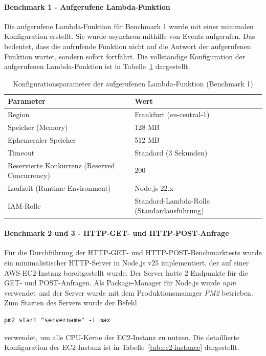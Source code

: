 \paragraph{Benchmark 1 - Aufgerufene Lambda-Funktion}
Die aufgerufene Lambda-Funktion für Benchmark 1 wurde mit einer minimalen Konfiguration erstellt. Sie wurde asynchron mithilfe von Events 
aufgerufen. Das bedeutet, dass die aufrufende Funktion nicht auf die Antwort der 
aufgerufenen Funktion wartet, sondern sofort fortfährt. Die vollständige Konfiguration der aufgerufenen Lambda-Funktion ist in Tabelle~\ref{tab:aufgerufene-lambda-config} dargestellt.
\begin{table}[H]
\centering
\caption{Konfigurationsparameter der aufgerufenen Lambda-Funktion (Benchmark 1)}
\label{tab:aufgerufene-lambda-config}
\begin{tabular}{|p{4cm}|p{4.5cm}|}
\hline
\textbf{Parameter} & \textbf{Wert} \\
\hline
Region & Frankfurt (eu-central-1) \\
\hline
Speicher (Memory) & 128 MB \\
\hline
Ephemeraler Speicher & 512 MB \\
\hline
Timeout & Standard (3 Sekunden) \\
\hline
Reservierte Konkurrenz (Reserved Concurrency) & 200 \\
\hline
Laufzeit (Runtime Environment) & Node.js 22.x \\
\hline
IAM-Rolle & Standard-Lambda-Rolle (Standardausführung) \\
\hline
\end{tabular}
\end{table}

\paragraph{Benchmark 2 und 3 - HTTP-GET- und HTTP-POST-Anfrage}
Für die Durchführung der HTTP-GET- und HTTP-POST-Benchmarktests wurde ein minimalistischer HTTP-Server in Node.js v25 implementiert, der auf 
einer AWS-EC2-Instanz bereitgestellt wurde. Der Server hatte 2 Endpunkte für die GET- und POST-Anfragen. Als Package-Manager für Node.js wurde 
\textit{npm} verwendet und der Server wurde mit dem Produktionsmanager \textit{PM2} betrieben. Zum Starten des Servers wurde der Befehl 
\begin{verbatim}
pm2 start "servername" -i max
\end{verbatim}
verwendet, um alle CPU-Kerne der EC2-Instanz zu nutzen. Die detaillierte Konfiguration der EC2-Instanz ist in Tabelle~\ref{tab:ec2-instance} dargestellt.


